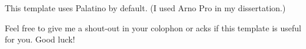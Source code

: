 \vcinfo{}

This template uses Palatino by default.  (I used Arno Pro in my dissertation.)

Feel free to give me a shout-out in your colophon or acks if this template is useful for you.  Good luck!